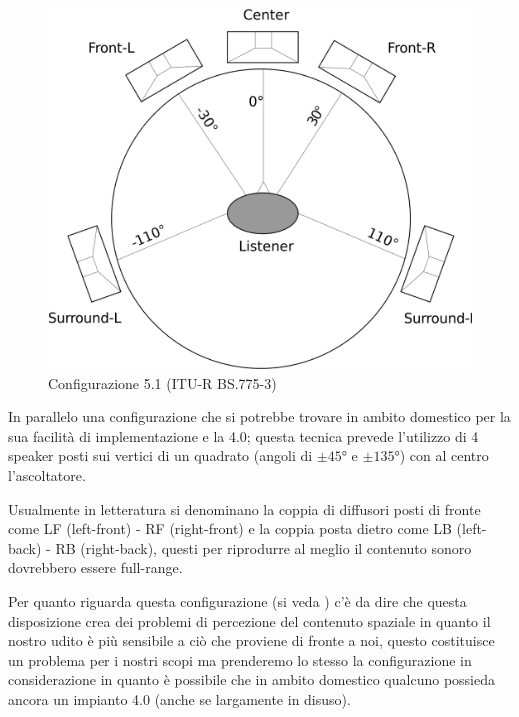 \documentclass[12pt,a4paper]{report}
\begin{document}
\begin{figure}[htbp]
	\centering
	\includegraphics[scale=0.18]{figures/5-1.png}
	\caption {Configurazione 5.1 (ITU-R BS.775-3)}
	\label{fig:5.1}
	\end{figure}

In parallelo una configurazione che si potrebbe trovare in ambito domestico per la sua facilità di implementazione e la 4.0; questa tecnica prevede l'utilizzo di 4 speaker posti sui vertici di un quadrato (angoli di $\pm45°$ e $\pm135°$) con al centro l'ascoltatore.

Usualmente in letteratura si denominano la coppia di diffusori posti di fronte come LF (left-front) - RF (right-front) e la coppia posta dietro come LB (left-back) - RB (right-back), questi per riprodurre al meglio il contenuto sonoro dovrebbero essere full-range.

Per quanto riguarda questa configurazione (si veda \cite{surround}) c'è da dire che questa disposizione crea dei problemi di percezione del contenuto spaziale in quanto il nostro udito è più sensibile a ciò che proviene di fronte a noi, questo costituisce un problema per i nostri scopi ma prenderemo lo stesso la configurazione in considerazione in quanto è possibile che in ambito domestico qualcuno possieda ancora un impianto 4.0 (anche se largamente in disuso).
\end{document}
